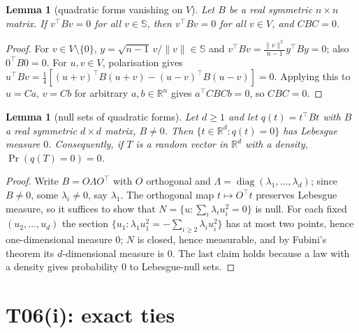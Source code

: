 \documentclass[11pt]{article}
\newtheorem{lemma}[theorem]{Lemma}
\theoremstyle{remark}
\newcommand{\R}{\mathbb R}
\newcommand{\Sph}{\mathbb S}
\begin{document}
\begin{lemma}[quadratic forms vanishing on $V$]\label{lem:polar}
Let $B$ be a real symmetric $n\times n$ matrix. If $v^\top Bv=0$ for all $v\in\Sph$, then $v^\top Bv=0$ for all $v\in V$, and $CBC=0$.
\end{lemma}
\begin{proof}
For $v\in V\setminus\{0\}$, $y=\sqrt{n-1}\,v/\|v\|\in\Sph$ and $v^\top Bv=\frac{\|v\|^2}{n-1}y^\top By=0$; also $0^\top B0=0$. For $u,v\in V$, polarisation gives $u^\top Bv=\frac14[(u+v)^\top B(u+v)-(u-v)^\top B(u-v)]=0$. Applying this to $u=Ca$, $v=Cb$ for arbitrary $a,b\in\R^n$ gives $a^\top CBCb=0$, so $CBC=0$.
\end{proof}

\begin{lemma}[null sets of quadratic forms]\label{lem:null}
Let $d\ge1$ and let $q(t)=t^\top Bt$ with $B$ a real symmetric $d\times d$ matrix, $B\ne0$. Then $\{t\in\R^d:q(t)=0\}$ has Lebesgue measure $0$. Consequently, if $T$ is a random vector in $\R^d$ with a density, $\Pr(q(T)=0)=0$.
\end{lemma}
\begin{proof}
Write $B=O\Lambda O^\top$ with $O$ orthogonal and $\Lambda=\operatorname{diag}(\lambda_1,\dots,\lambda_d)$; since $B\ne0$, some $\lambda_i\ne0$, say $\lambda_1$. The orthogonal map $t\mapsto O^\top t$ preserves Lebesgue measure, so it suffices to show that $N=\{u:\sum_i\lambda_iu_i^2=0\}$ is null. For each fixed $(u_2,\dots,u_d)$ the section $\{u_1:\lambda_1u_1^2=-\sum_{i\ge2}\lambda_iu_i^2\}$ has at most two points, hence one-dimensional measure $0$; $N$ is closed, hence measurable, and by Fubini's theorem its $d$-dimensional measure is $0$. The last claim holds because a law with a density gives probability $0$ to Lebesgue-null sets.
\end{proof}

\section{T06(i): exact ties}\label{sec:T06i}
\end{document}
